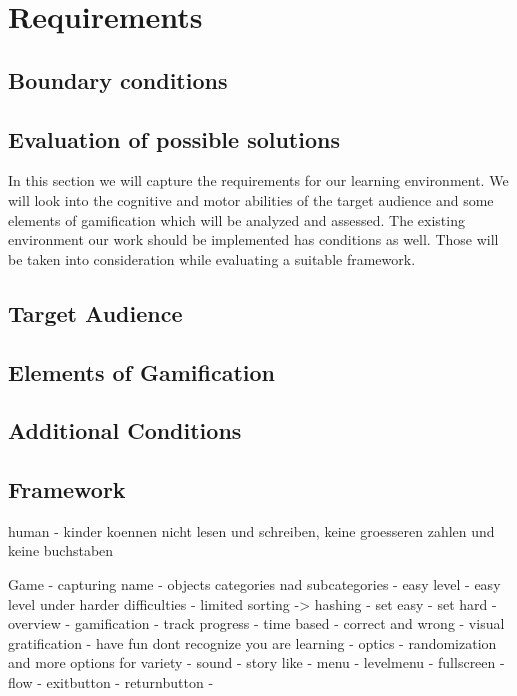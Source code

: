 
\chapter{Requirements}
\label{chap:requirements}

\section{Boundary conditions}

\section{Evaluation of possible solutions}

In this section we will capture the requirements for our learning environment.
We will look into the cognitive and motor abilities of the target audience and
some elements of gamification which will be analyzed and assessed.
The existing environment our work should be implemented has conditions as well.
Those will be taken into consideration while evaluating a suitable framework.

\section*{Target Audience}
\section*{Elements of Gamification}
\section*{Additional Conditions}
\section*{Framework}

human
- kinder koennen nicht lesen und schreiben, keine groesseren zahlen und keine buchstaben

Game
- capturing name
- objects categories nad subcategories
- easy level
- easy level under harder difficulties
- limited sorting -> hashing
- set easy
- set hard
- overview
- gamification
    - track progress
        - time based
        - correct and wrong
        - visual gratification
    - have fun dont recognize you are learning
        - optics
            - randomization and more options for variety
        - sound
        - story like
    - menu
    - levelmenu
    - fullscreen
    - flow
        - exitbutton
        - returnbutton
    -


